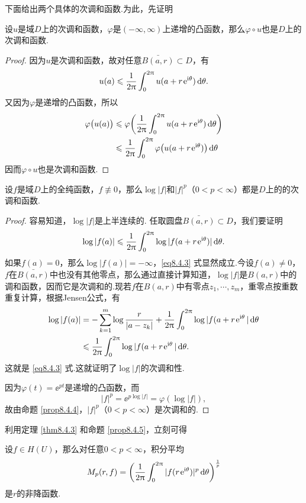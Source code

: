 下面给出两个具体的次调和函数.为此，先证明
\begin{prop}\label{prop8.4.4}
设$u$是域$D$上的次调和函数，$\varphi$是$(-\infty,\infty)$上递增的凸函数，那么$\varphi\circ u$也是$D$上的次调和函数.
\end{prop}
\begin{proof}
因为$u$是次调和函数，故对任意$\bar{B(a,r)}\subset D$，有
\[u(a)\leqslant\frac1{2\uppi}\int_0^{2\uppi}u(a+r\operatorname{\!\!\;\mathrm e}^{\mathrm i\theta})\mathop{}\!\mathrm{d} \theta.\]
又因为$\varphi$是递增的凸函数，所以
\begin{align*}
\varphi\big(u(a)\big)&\leqslant\varphi\bigg(\frac1{2\uppi}\int_0^{2\uppi}u(a+r\operatorname{\!\!\;\mathrm e}^{\mathrm i\theta})\mathop{}\!\mathrm{d} \theta\bigg)\\
&\leqslant\frac1{2\uppi}\int_0^{2\uppi}\varphi\big(u(a+r\operatorname{\!\!\;\mathrm e}^{\mathrm i\theta})\big)\mathop{}\!\mathrm{d} \theta
\end{align*}
因而$\varphi\circ u$也是次调和函数.
\end{proof}

\begin{prop}\label{prop8.4.5}
设$f$是域$D$上的全纯函数，$f\not\equiv 0$，那么$\log|f|$和$|f|^p$（$0<p<\infty$）都是$D$上的的次调和函数.
\end{prop}
\begin{proof}
容易知道，$\log|f|$是上半连续的. 任取圆盘$\bar{B(a,r)}\subset D$，我们要证明
\begin{equation}\label{eq8.4.3}
\log|f(a)|\leqslant\frac1{2\uppi}\int_0^{2\uppi}\log|f(a+r\operatorname{\!\!\;\mathrm e}^{\mathrm i\theta})|\mathop{}\!\mathrm{d} \theta.
\end{equation}
如果$f(a)=0$，那么$\log|f(a)|=-\infty$，\eqref{eq8.4.3} 式显然成立.今设$f(a)\ne0$，$f$在$\bar{B(a,r)}$中也没有其他零点，那么通过直接计算知道，$\log|f|$是$B(a,r)$中的调和函数，因而它是次调和的.现若$f$在$B(a,r)$中有零点$z_1,\cdots,z_m$，重零点按重数重复计算，根据Jensen公式，有
\begin{align*}
\log|f(a)|&=-\sum_{k=1}^m\log\frac r{|a-z_k|}+\frac1{2\uppi}\int_0^{2\uppi}\log|f(a+r\operatorname{\!\!\;\mathrm e}^{\mathrm i\theta}|\mathop{}\!\mathrm{d} \theta\\
&\leqslant\frac1{2\uppi}\int_0^{2\uppi}\log|f(a+r\operatorname{\!\!\;\mathrm e}^{\mathrm i\theta}|\mathop{}\!\mathrm{d} \theta.
\end{align*}
这就是 \eqref{eq8.4.3} 式.这就证明了$\log|f|$的次调和性.

因为$\varphi(t)=\ee^{pt}$是递增的凸函数，而
\[|f|^p=\ee^{p\log|f|}=\varphi(\log|f|),\]
故由命题 \ref{prop8.4.4}，$|f|^p$（$0<p<\infty$）是次调和的.
\end{proof}

利用定理 \ref{thm8.4.3} 和命题 \ref{prop8.4.5}，立刻可得
\begin{prop}\label{prop8.4.6}
设$f\in H(U)$，那么对任意$0<p<\infty$，积分平均
\[M_p(r,f)=\bigg(\frac1{2\uppi}\int_0^{2\uppi}|f(r\operatorname{\!\!\;\mathrm e}^{\mathrm i\theta})|^p\mathop{}\!\mathrm{d} \theta\bigg)^{\frac1p}\]
是$r$的非降函数.
\end{prop}

